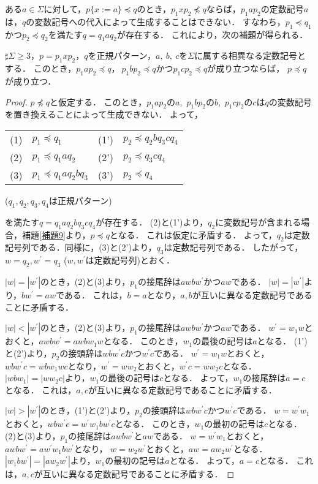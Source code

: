 ある$a \in  \Sigma$に対して，$p \{ x:=a \} \preceq q$のとき，$p_{1}xp_{2} \not \preceq q$ならば，$p_{1}ap_{2}$の定数記号$a$は，$q$の変数記号への代入によって生成することはできない．
すなわち，$p_{1} \preceq q_{1}$かつ$p_{2} \preceq q_{2}$を満たす$q=q_{1}aq_{2}$が存在する．
これにより，次の補題が得られる．
\begin{lem}\label{補題10}
$\sharp \Sigma \ge 3$，$p=p_{1}xp_{2}，q$を正規パターン，$a,~b,~c$を$\Sigma$に属する相異なる定数記号とする．
このとき，$p_{1}ap_{2} \preceq q$，$\ p_{1}bp_{2} \preceq q$かつ$p_{1}cp_{2} \preceq q$が成り立つならば，
$p\preceq q$が成り立つ．
\end{lem}
\begin{proof}
$p \not \preceq q$と仮定する．
このとき，$p_{1}ap_{2}$の$a$,~$p_{1}bp_{2}$の$b$,~$p_{1}cp_{2}$の$c$は$q$の変数記号を置き換えることによって生成できない．
よって，
\medskip

\begin{tabular}{llll}
(1) & $p_{1} \preceq q_{1}$ & (1') & $p_{2} \preceq q_{2}bq_{3}cq_{4}$ \\
(2) & $p_{1} \preceq q_{1}aq_{2}$ & (2') & $p_{2} \preceq q_{3}cq_{4}$ \\
(3) & $p_{1} \preceq q_{1}aq_{2}bq_{3}$ & (3') & $p_{2} \preceq q_{4}$
\end{tabular}	
\indent ($q_{1}, q_{2}, q_{3}, q_{4}$は正規パターン) 	
\medskip

\noindent を満たす$q=q_{1}aq_{2}bq_{3}cq_{4}$が存在する．
(2)と(1')より，$q_{2}$に変数記号が含まれる場合，補題\ref{補題9}より，$p \preceq q$となる．
これは仮定に矛盾する．
よって，$q_{2}$は定数記号列である．同様に，(3)と(2')より，$q_{3}$は定数記号列である．
したがって，$w=q_{2}, w^{\prime}=q_{3}$ ($w, w^{\prime}$は定数記号列)とおく．

$|w|=|w^{\prime}|$のとき，(2)と(3)より，$p_{1}$の接尾辞は$awbw^{\prime}$かつ$aw$である．
$|w|=|w^{\prime}|$より，$bw^{\prime}=aw$である．
これは，$b=a$となり，$a, b$が互いに異なる定数記号であることに矛盾する．

$|w| < |w^{\prime}|$のとき，(2)と(3)より，$p_{1}$の接尾辞は$awbw^{\prime}$かつ$aw$である．
$w^{\prime}=w_{1}w$とおくと，$awbw^{\prime}=awbw_{1}w$となる．
このとき，$w_{1}$の最後の記号は$a$となる．
(1')と(2')より，$p_{2}$の接頭辞は$wbw^{\prime}c$かつ$w^{\prime}c$である．
$w^{\prime}=w_{1}w$とおくと，$wbw^{\prime}c=wbw_{1}wc$となり，$w^{\prime}=ww_{2}$とおくと，$w^{\prime}c=ww_{2}c$となる．
$|wbw_{1}|=|ww_{2}c|$より，$w_{1}$の最後の記号は$c$となる．
よって，$w_{1}$の接尾辞は$a=c$となる．
これは，$a, c$が互いに異なる定数記号であることに矛盾する．

$|w| > |w^{\prime}|$のとき，(1')と(2')より，$p_{2}$の接頭辞は$wbw^{\prime}c$かつ$w^{\prime}c$である．
$w=w^{\prime}w_{1}$とおくと，$wbw^{\prime}c=w^{\prime}w_{1}bw^{\prime}c$となる．
このとき，$w_{1}$の最初の記号は$c$となる．
(2)と(3)より，$p_{1}$の接尾辞は$awbw^{\prime}$と$aw$である．
$w=w^{\prime}w_{1}$とおくと，$awbw^{\prime}=aw^{\prime}w_{1}bw^{\prime}$となり， $w=w_{2}w^{\prime}$とおくと，$aw=aw_{2}w^{\prime}$となる．
$|w_{1}bw^{\prime}|=|aw_{2}w^{\prime}|$より，$w_{1}$の最初の記号は$a$となる．
よって，$a=c$となる．
これは，$a, c$が互いに異なる定数記号であることに矛盾する．
\end{proof}
